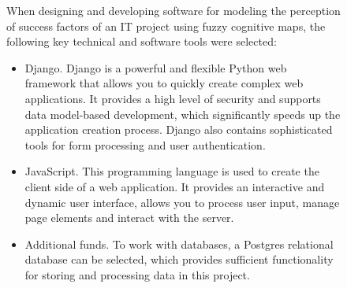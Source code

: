 \documentclass{article}
\begin{document}
\begin{figure}[!t]
\begin{minipage}{0.49\textwidth}
            When designing and developing software for modeling the perception of success factors of an IT project using fuzzy cognitive maps, the following key technical and software tools were selected:\\
            \begin{itemize}
                \item Django. Django is a powerful and flexible Python web framework that allows you to quickly create complex web applications. It provides a high level of security and supports data model-based development, which significantly speeds up the application creation process. Django also contains sophisticated tools for form processing and user authentication.
                \item JavaScript. This programming language is used to create the client side of a web application. It provides an interactive and dynamic user interface, allows you to process user input, manage page elements and interact with the server.
                \item Additional funds. To work with databases, a Postgres relational database can be selected, which provides sufficient functionality for storing and processing data in this project.
            \end{itemize}
            ~\\
            ~\\
            ~\\
            ~\\
            ~\\
            ~\\
            ~\\
            ~\\
            ~\\
            ~\\
            ~\\
            ~\\
            ~\\
            ~\\
            ~\\
            ~\\
            ~\\
            ~\\
            ~\\
            ~\\
            ~\\
            ~\\
            ~\\

\end{minipage}
\end{figure}
\end{document}
